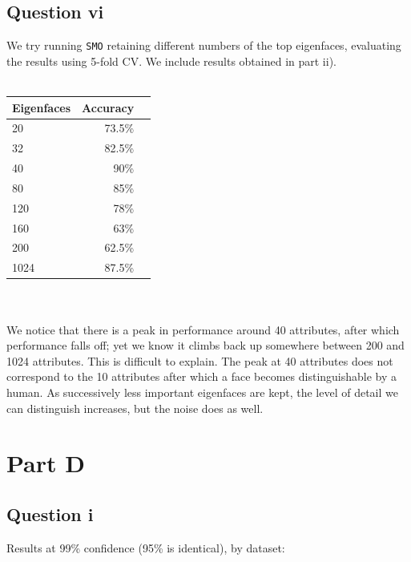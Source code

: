 \documentclass[a4paper]{article}
\begin{document}
\subsection*{Question vi}
We try running {\tt SMO} retaining different numbers of the top eigenfaces, evaluating the results using 5-fold CV. We include results obtained in part ii).\\
\\
\begin{tabular}{lrr}
Eigenfaces & Accuracy \\
\hline
20 & 73.5\% \\
32 & 82.5\% \\
40 & 90\% \\
80 & 85\% \\
120 & 78\% \\
160 & 63\% \\
200 & 62.5\% \\
1024 & 87.5\% \\
\end{tabular}\\
\\
We notice that there is a peak in performance around 40 attributes, after which performance falls off; yet we know it climbs back up somewhere between 200 and 1024 attributes. This is difficult to explain. The peak at 40 attributes does not correspond to the 10 attributes after which a face becomes distinguishable by a human. As successively less important eigenfaces are kept, the level of detail we can distinguish increases, but the noise does as well. 

\section*{Part D}
\subsection*{Question i}

Results at 99\% confidence (95\% is identical), by dataset:
\end{document}
